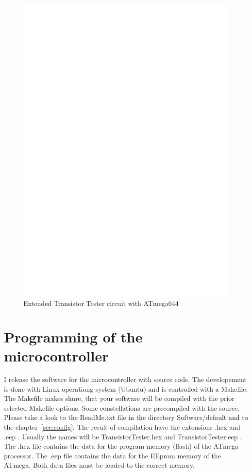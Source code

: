 \begin{figure}[H]
\centering
\includegraphics[width=18cm]{../FIG/t644tester.eps}
\caption{Extended Transistor Tester circuit with ATmega644}
\label{fig:t644tester}
\end{figure}



\section{Programming of the microcontroller}
I release the software for the microcontroller with source code.
The developement is done with Linux operationg system (Ubuntu) and
is controlled with a Makefile. The Makefile makes shure, that your
software will be compiled with the prior selected Makefile options. Some constellations
are precompiled with the source. Please take a look to the ReadMe.txt file
in the directory Software/default and to the chapter~\ref{sec:config}.
The result of compilation have the extensions .hex and .eep .
Usually the names will be TransistorTester.hex and TransistorTester.eep .
The .hex file contains the data for the program memory (flash) of the ATmega processor.
The .eep file contains the data for the EEprom memory of the ATmega. Both data files
must be loaded to the correct memory.

